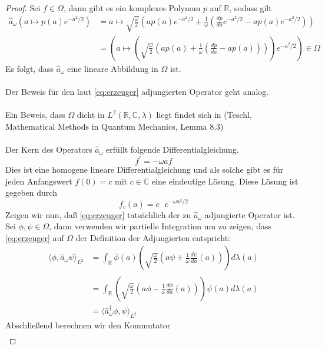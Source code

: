 \documentclass[11pt,a4paper,leqno]{report}
\numberwithin{equation}{chapter}
\begin{document}
\begin{proof}
	Sei $f\in\Omega$, dann gibt es ein komplexes Polynom $p$ auf $\mathbb{R}$, sodass gilt
	\begin{align*}
		\hat{a}_\omega (a\mapsto p(a)e^{-a^2/2}) &= a \mapsto \sqrt{\frac{\omega}{2}}(a p(a)e^{-a^2/2} +  \frac{1}{\omega}(\frac{dp}{da}e^{-a^2/2} - a p(a)e^{-a^2/2}))\\&=(a \mapsto (\sqrt{\frac{\omega}{2}}(a p(a) +  \frac{1}{\omega}(\frac{dp}{da} - a p(a))))e^{-a^2/2})\in \Omega
	\end{align*}
Es folgt, dass $\hat{a}_\omega$ eine lineare Abbildung in $\Omega$ ist. \\
\\
Der Beweis f\"ur den laut \ref{eq:erzeuger} adjungierten Operator geht analog.\\
\\
Ein Beweis, dass $\Omega$ dicht in $L^2(\mathbb{R}, \mathbb{C},\lambda)$ liegt findet sich in (Teschl, Mathematical Methods in Quantum Mechanics, Lemma 8.3)\\
\\
Der Kern des Operators $\hat{a}_\omega$ erf\"ullt folgende Differentialgleichung.
\begin{equation*}
	f^\prime=-\omega a f
\end{equation*}
Dies ist eine homogene lineare Differentialgleichung und als solche gibt es f\"ur jeden Anfangswert $f(0)=c$ mit $c\in \mathbb{C}$ eine eindeutige L\"osung. Diese L\"osung ist gegeben durch
\begin{equation*}
	f_c(a) = c\textrm{ }e^{-\omega a^2 / 2}
\end{equation*}
Zeigen wir nun, da\ss{} \eqref{eq:erzeuger} tats\"achlich der zu $\hat{a}_\omega$ adjungierte Operator ist.
Sei $\phi, \psi \in \Omega$, dann verwenden wir partielle Integration um zu zeigen, dass \eqref{eq:erzeuger} auf $\Omega$ der Definition der Adjungierten entspricht:
\begin{align*}
	\langle \phi, \hat{a}_\omega\psi\rangle_{L^2} &= 
	\int_\mathbb{R} \overline{\phi}(a)( \sqrt{\frac{\omega}{2}}(a\psi +  \frac{1}{\omega}\frac{d\psi}{da}(a)))d\lambda(a)\\&=
	\int_\mathbb{R} \overline{( \sqrt{\frac{\omega}{2}}(a\phi -  \frac{1}{\omega}\frac{d\phi}{da}(a)))}\psi(a) d\lambda(a)\\&=\langle \hat{a}^\dagger_\omega\phi, \psi\rangle_{L^2}
\end{align*}
Abschlie\ss{}end berechnen wir den Kommutator
\begin{align*}

\end{align*}
\end{proof}
\end{document}
